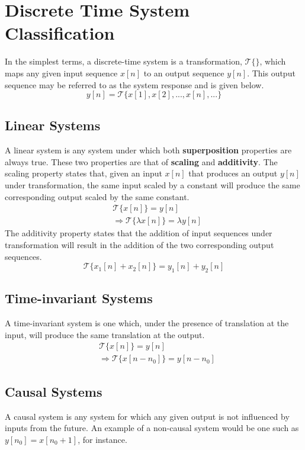 \section{Discrete Time System Classification}
In the simplest terms, a discrete-time system is a transformation, $\mathcal{T}\{\}$, which maps any given input sequence $x[n]$ to an output sequence $y[n]$. This output sequence may be referred to as the system response and is given below.
$$ y[n] = \mathcal{T}\{ x[1], x[2], ..., x[n], ... \} $$

\subsection{Linear Systems}
A linear system is any system under which both \textbf{superposition} properties are always true. These two properties are that of \textbf{scaling} and \textbf{additivity}. The scaling property states that, given an input $x[n]$ that produces an output $y[n]$ under transformation, the same input scaled by a constant will produce the same corresponding output scaled by the same constant. \vspace{-3mm}
\begin{align*}
&\mathcal{T}\{x[n]\} = y[n] \\
&\Longrightarrow \mathcal{T}\{ \lambda x[n]\} = \lambda y[n]
\end{align*}
The additivity property states that the addition of input sequences under transformation will result in the addition of the two corresponding output sequences.
$$\mathcal{T}\{x_1[n] + x_2[n]\} = y_1[n] + y_2[n]$$

\subsection{Time-invariant Systems}
A time-invariant system is one which, under the presence of translation at the input, will produce the same translation at the output.
\begin{align*}
&\mathcal{T}\{x[n]\} = y[n] \\
&\Longrightarrow \mathcal{T}\{ x[n-n_0]\} = y[n-n_0]
\end{align*}

\subsection{Causal Systems}
A causal system is any system for which any given output is not influenced by inputs from the future. An example of a non-causal system would be one such as $y[n_0] = x[n_0 + 1]$, for instance.

